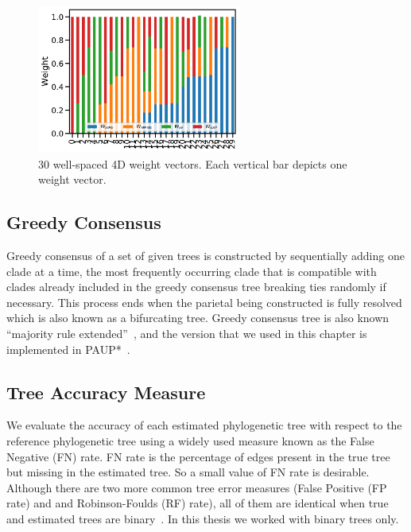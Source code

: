 \begin{figure}[!htbp]%
	\centering
	\includegraphics[width=0.6\textwidth]{Figure/30-4D-weight}
	\caption{30 well-spaced 4D weight vectors. Each vertical bar depicts one weight vector.}
	\label{fig:30-weights}
\end{figure}

\subsection{Greedy Consensus}

Greedy consensus of a set of given trees is constructed by sequentially
adding one clade at a time, the most frequently occurring clade that is compatible with clades already included
in the greedy consensus tree breaking ties randomly if necessary.
This process
ends when the parietal being constructed is fully resolved which is also known as a bifurcating tree. 
Greedy consensus tree is also known ``majority rule extended''~\cite{phylip}, and the version that we used in this chapter is implemented in PAUP*~\cite{swofford_paup*_2002}. 

\subsection{Tree Accuracy Measure} 
We evaluate the accuracy of each estimated phylogenetic tree with respect to the reference phylogenetic tree using a widely used measure known as the False Negative (FN) rate. FN rate is the percentage of edges present in the true tree but missing in the estimated tree. So a small value of FN rate is desirable. Although there are two more common tree error measures (False Positive (FP rate) and and Robinson-Foulds (RF) rate), all of them are identical when true and estimated trees are binary~\citep{warnow2017computational}. In this thesis we worked with binary trees only. %

